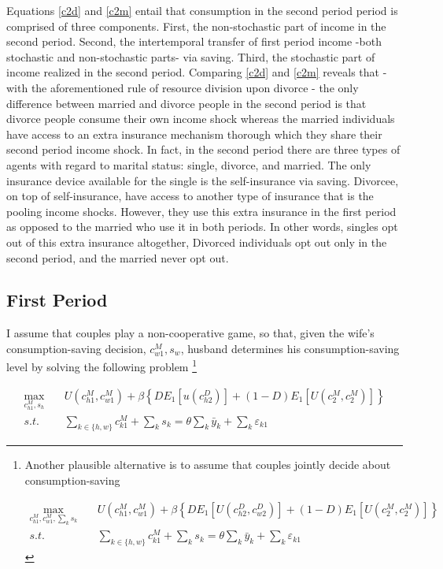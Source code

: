 Equations \eqref{c2d} and \eqref{c2m} entail that consumption in the second period period is comprised of three components. First, the non-stochastic part of income in the second period. Second, the intertemporal transfer of first period income -both stochastic and non-stochastic parts- via saving. Third, the stochastic part of income realized in the second period. Comparing \eqref{c2d} and \eqref{c2m}  reveals that - with the aforementioned rule of resource division upon divorce - the only difference between married and divorce people in the second period is that divorce people consume their own income shock whereas the married individuals have access to an extra insurance mechanism thorough which they share their second period income shock. In fact, in the second period there are three types of agents with regard to marital status: single, divorce, and married. The only insurance device available for the single is the self-insurance via saving. Divorcee, on top of self-insurance, have access to another type of insurance that is the pooling income shocks. However, they use this extra insurance in the first period as opposed to the married who use it in both periods. In other words, singles opt out of this extra insurance altogether, Divorced individuals opt out only in the second period, and the married never opt out. 

\subsection{First Period}

I assume that couples play a non-cooperative game, so that, given the wife's consumption-saving decision, $c_{w1}^M, s_w$, husband determines his consumption-saving level by solving the following problem \footnote{Another plausible alternative is to assume that couples jointly decide about consumption-saving 

\begin{align*}
\max_{c_{h1}^M, c_{w1}^M, \sum_{k} s_k} \quad  &U(c_{h1}^M, c_{w1}^M) + \beta \left \{ D E_1[ U(c^D_{h2}, c^D_{w2})] + (1-D) E_1 [U(c_{2}^M, c_{2}^M)] \right \}  \\
s.t. &\sum_{k \in \{h,w\}} c^M_{k1} + \sum_k s_k = \theta \sum_k \bar y_k + \sum_k \varepsilon_{k1}
\end{align*}

}



\begin{align}
\max_{c_{h1}^M, s_h} \quad  &U(c_{h1}^M, c_{w1}^M) + \beta \left \{ D E_1[ u(c^D_{h2})] + (1-D) E_1 [U(c_{2}^M, c_{2}^M)] \right \} \nonumber \\
s.t. &\sum_{k \in \{h,w\}} c^M_{k1} + \sum_k s_k = \theta \sum_k \bar y_k + \sum_k \varepsilon_{k1} \label{p1constraint}
\end{align}

